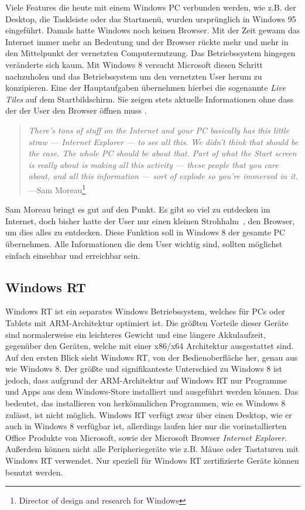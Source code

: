 \documentclass[12pt,a4paper,bibtotoc,abstracton]{scrartcl}
\begin{document}
Viele Features die heute mit einem Windows PC verbunden werden, wie z.B. der Desktop, die Taskleiste oder das Startmenü, wurden ursprünglich in Windows 95 eingeführt. Damals hatte Windows noch keinen Browser. Mit der Zeit gewann das Internet immer mehr an Bedeutung und der Browser rückte mehr und mehr in den Mittelpunkt der vernetzten Computernutzung. Das Betriebssystem hingegen veränderte sich kaum. Mit Windows 8 versucht Microsoft diesen Schritt nachzuholen und das Betriebssystem um den vernetzten User herum zu konzipieren. Eine der Hauptaufgaben übernehmen hierbei die sogenannte \textit{Live Tiles} auf dem Startbildschirm. Sie zeigen stets aktuelle Informationen ohne dass der der User den Browser öffnen muss \citep{Pachal2012}. 

\begin{quote}
\textit{There's tons of stuff on the Internet and your PC basically has this little straw — Internet Explorer — to see all this. We didn't think that should be the case. The whole PC should be about that. Part of what the Start screen is really about is making all this activity — these people that you care about, and all this information — sort of explode so you're immersed in it.} ---Sam Moreau\footnote{Director of design and research for Windows}
\end{quote}

Sam Moreau bringt es gut auf den Punkt. Es gibt so viel zu entdecken im Internet, doch bisher hatte der User nur einen kleinen \glqq Strohhalm\grqq\ , den Browser, um dies alles zu entdecken. Diese Funktion soll in Windows 8 der gesamte PC übernehmen. Alle Informationen die dem User wichtig sind, sollten möglichst einfach einsehbar und erreichbar sein.



\subsection{Windows RT}
\label{subsec:winRT}
Windows RT ist ein separates Windows Betriebssystem, welches für PCs oder Tablets mit ARM-Architektur optimiert ist. Die größten Vorteile dieser Geräte sind normalerweise ein leichteres Gewicht und eine längere Akkulaufzeit, gegenüber den Geräten, welche mit einer x86/x64 Architektur ausgestattet sind. Auf den ersten Blick sieht Windows RT, von der Bedienoberfläche her, genau aus wie Windows 8. Der größte und signifikanteste Unterschied zu Windows 8 ist jedoch, dass aufgrund der ARM-Architektur auf Windows RT nur Programme und Apps aus dem Windows-Store installiert und ausgeführt werden können. Das bedeutet, das installieren von herkömmlichen Programmen, wie es Windows 8 zulässt, ist nicht möglich. Windows RT verfügt zwar über einen Desktop, wie er auch in Windows 8 verfügbar ist, allerdings laufen hier nur die vorinstallierten Office Produkte von Microsoft, sowie der Microsoft Browser \textit{Internet Explorer}. Außerdem können nicht alle Peripheriegeräte wie z.B. Mäuse oder Tastaturen mit Windows RT verwendet. Nur speziell für Windows RT zertifizierte Geräte können benutzt werden. \citep{MicrosoftWinRT}  
 
\end{document}
